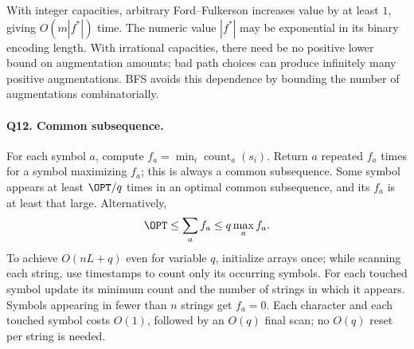 With integer capacities, arbitrary Ford--Fulkerson increases value by at
least $1$, giving $O(m|f^*|)$ time.  The numeric value $|f^*|$ may be
exponential in its binary encoding length.  With irrational capacities,
there need be no positive lower bound on augmentation amounts; bad path
choices can produce infinitely many positive augmentations.  BFS avoids
this dependence by bounding the number of augmentations combinatorially.

\paragraph{Q12. Common subsequence.}
For each symbol $a$, compute $f_a=\min_i\operatorname{count}_a(s_i)$.
Return $a$ repeated $f_a$ times for a symbol maximizing $f_a$; this is
always a common subsequence.  Some symbol appears at least $\OPT/q$ times
in an optimal common subsequence, and its $f_a$ is at least that large.
Alternatively,
\[
\OPT\le\sum_a f_a\le q\max_a f_a.
\]
To achieve $O(nL+q)$ even for variable $q$, initialize arrays once; while
scanning each string, use timestamps to count only its occurring symbols.
For each touched symbol update its minimum count and the number of strings
in which it appears.  Symbols appearing in fewer than $n$ strings get
$f_a=0$.  Each character and each touched symbol costs $O(1)$, followed
by an $O(q)$ final scan; no $O(q)$ reset per string is needed.

